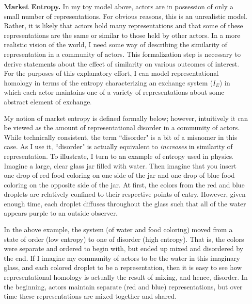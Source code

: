 \textbf{Market Entropy.}
In my toy model above, actors are in possession of only a small number of representations. For obvious reasons, this is an unrealistic model. Rather, it is likely that actors hold many representations and that some of these representations are the same or similar to those held by other actors. In a more realistic vision of the world, I need some way of describing the similarity of representation in a community of actors. This formalization step is necessary to derive statements about the effect of similarity on various outcomes of interest. For the purposes of this explanatory effort, I can model representational homology in terms of the entropy characterizing an exchange system ($I_E$) in which each actor maintains one of a variety of representations about some abstract element of exchange.  
 
My notion of market entropy is defined formally below; however, intuitively it can be viewed as the amount of representational disorder in a community of actors. While technically consistent, the term ``disorder" is a bit of a misnomer in this case. As I use it, ``disorder" is actually equivalent to \emph{increases} in similarity of representation. To illustrate, I turn to an example of entropy used in physics. Imagine a large, clear glass jar filled with water. Then imagine that you insert one drop of red food coloring on one side of the jar and one drop of blue food coloring on the opposite side of the jar. At first, the colors from the red and blue droplets are relatively confined to their respective points of entry. However, given enough time, each droplet diffuses throughout the glass such that all of the water appears purple to an outside observer. 
 
In the above example, the system (of water and food coloring) moved from a state of order (low entropy) to one of disorder (high entropy). That is, the colors were separate and ordered to begin with, but ended up mixed and disordered by the end. If I imagine my community of actors to be the water in this imaginary glass, and each colored droplet to be a representation, then it is easy to see how representational homology is actually the result of mixing, and hence, disorder. In the beginning, actors maintain separate (red and blue) representations, but over time these representations are mixed together and shared.
 
